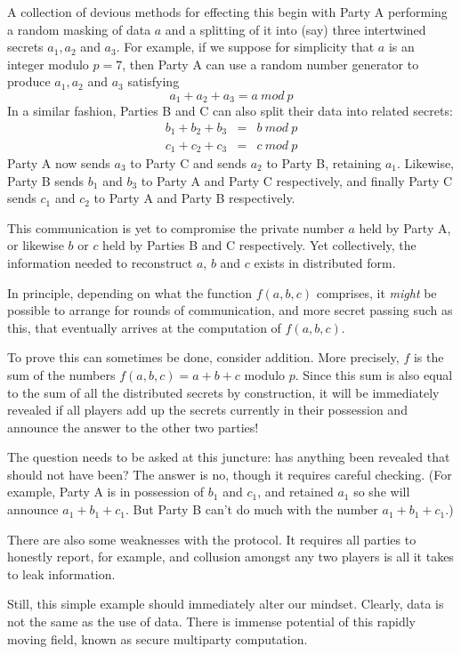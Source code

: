A collection of devious methods for effecting this begin with Party A performing a random masking of data $a$ and a splitting of it into (say) three intertwined secrets $a_1, a_2$ and $a_3$. For example, if we suppose for simplicity that $a$ is an integer modulo $p=7$, then Party A can use a random number generator to produce $a_1, a_2$ and $a_3$ satisfying 
$$
       a_1 + a_2 + a_3 = a\ mod\ p 
$$
In a similar fashion, Parties B and C can also split their data into related secrets:
\begin{eqnarray*}
  b_1 + b_2 + b_3 & = &  b\ mod\ p \\
  c_1 + c_2 + c_3 & = &  c\ mod\ p 
\end{eqnarray*}
Party A now sends $a_3$ to Party C and sends $a_2$ to Party B, retaining $a_1$. Likewise, Party B sends $b_1$ and $b_3$ to Party A and Party C respectively, and finally Party C sends $c_1$ and $c_2$ to Party A and Party B respectively. 

This communication is yet to compromise the private number $a$ held by Party A, or likewise $b$ or $c$ held by Parties B and C respectively. Yet collectively, the information needed to reconstruct $a$, $b$ and $c$ exists in distributed form. 

In principle, depending on what the function $f(a,b,c)$ comprises, it {\em might} be possible to arrange for rounds of communication, and more secret passing such as this, that eventually arrives at the computation of $f(a,b,c)$. 

To prove this can sometimes be done, consider addition. More precisely, $f$ is the sum of the numbers $f(a,b,c)=a+b+c$ modulo $p$. Since this sum is also equal to the sum of all the distributed secrets by construction, it will be immediately revealed if all players add up the secrets currently in their possession and announce the answer to the other two parties! 

The question needs to be asked at this juncture: has anything been revealed that should not have been? The answer is no, though it requires careful checking. (For example, Party A is in possession of $b_1$ and $c_1$, and retained $a_1$ so she will announce $a_1+b_1+c_1$. But Party B can't do much with the number $a_1+b_1+c_1$.) 

There are also some weaknesses with the protocol. It requires all parties to honestly report, for example, and collusion amongst any two players is all it takes to leak information. 

Still, this simple example should immediately alter our mindset. Clearly, data is not the same as the use of data. There is immense potential of this rapidly moving field, known as secure multiparty computation. 

